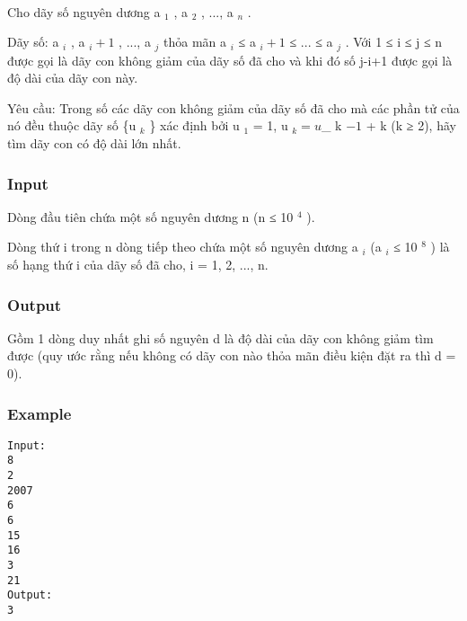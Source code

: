 

 

Cho dãy số nguyên dương a $_ 1 $ , a $_ 2 $ , ..., a $_ n $ .

Dãy số: a $_ i $ , a $_ i+1 $ , ..., a $_ j $ thỏa mãn a $_ i $ ≤ a $_ i+1 $ ≤ ... ≤ a $_ j $ . Với 1 ≤ i ≤ j ≤ n được gọi là dãy con không giảm của dãy số đã cho và khi đó số j-i+1 được gọi là độ dài của dãy con này.

Yêu cầu: Trong số các dãy con không giảm của dãy số đã cho mà các phần tử của nó đều thuộc dãy số \{u $_ k $ \} xác định bởi u $_ 1 $ = 1, u $_ k = u $_ k $ -1 $ + k (k ≥ 2), hãy tìm dãy con có độ dài lớn nhất.

\subsubsection{Input}

Dòng đầu tiên chứa một số nguyên dương n (n ≤ 10 $^ 4 $ ).

Dòng thứ i trong n dòng tiếp theo chứa một số nguyên dương a $_ i $ (a $_ i $ ≤ 10 $^ 8 $ ) là số hạng thứ i của dãy số đã cho, i = 1, 2, ..., n.

\subsubsection{Output}

Gồm 1 dòng duy nhất ghi số nguyên d là độ dài của dãy con không giảm tìm được (quy ước rằng nếu không có dãy con nào thỏa mãn điều kiện đặt ra thì d = 0).

\subsubsection{Example}
\begin{verbatim}
Input:
8
2
2007
6
6
15
16
3
21
Output:
3

\end{verbatim}